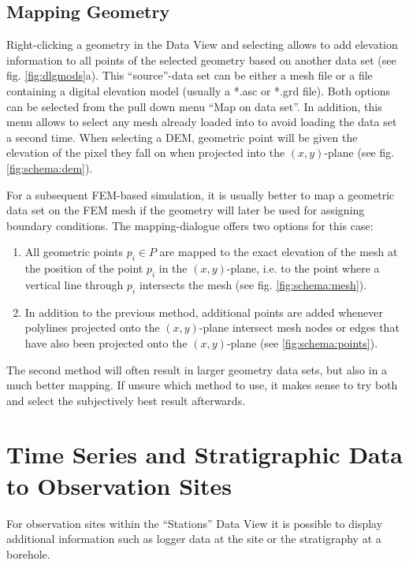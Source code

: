 \subsection{Mapping Geometry}

Right-clicking a geometry in the Data View and selecting  allows to add elevation information to all points of the selected geometry based on another data set (see fig. \ref{fig:dlgmods}a). This ``source''-data set can be either a mesh file or a file containing a digital elevation model (usually a *.asc or *.grd file). Both options can be selected from the pull down menu ``Map on data set''. In addition, this menu allows to select any mesh already loaded into \ogs to avoid loading the data set a second time. When selecting a DEM, geometric point will be given the elevation of the pixel they fall on when projected into the $(x,y)$-plane (see fig. \ref{fig:schema:dem}).

For a subsequent FEM-based simulation, it is usually better to map a geometric data set on the FEM mesh if the geometry will later be used for assigning boundary conditions. The mapping-dialogue offers two options for this case:

\begin{enumerate}
\item All geometric points $p_i \in P$ are mapped to the exact elevation of the mesh at the position of the point $p_i$ in the $(x,y)$-plane, i.e. to the point where a vertical line through $p_i$ intersects the mesh (see fig. \ref{fig:schema:mesh}).
\item In addition to the previous method, additional points are added whenever polylines projected onto the $(x,y)$-plane intersect mesh nodes or edges that have also been projected onto the $(x,y)$-plane (see \ref{fig:schema:points}).
\end{enumerate}

The second method will often result in larger geometry data sets, but also in a much better mapping. If unsure which method to use, it makes sense to try both and select the subjectively best result afterwards.


\section{Time Series and Stratigraphic Data to Observation Sites}

For observation sites within the ``Stations'' Data View it is possible to display additional information such as logger data at the site or the stratigraphy at a borehole.

